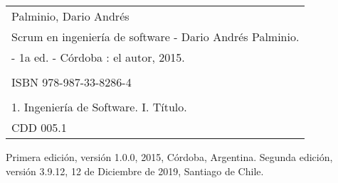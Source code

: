 
\newpage



\begin{table}
\centering
    \begin{tabular}{|l|}
    \hline
    {\small Palminio, Dario Andrés} \\   
    {\small Scrum en ingeniería de software - Dario Andrés Palminio.} \\ 
    {\small - 1a ed. -  Córdoba : el autor, 2015.}
         \\ \\   
         {\small ISBN 978-987-33-8286-4 } \\ \\   
         {\small 1. Ingeniería de Software. I. Título.}  \\   
         {\small CDD 005.1}  \\ \hline
    \end{tabular}
\end{table}


Primera edición, versión 1.0.0, 2015, Córdoba, Argentina.
Segunda edición, versión 3.9.12, 12 de Diciembre de 2019, Santiago de Chile.


